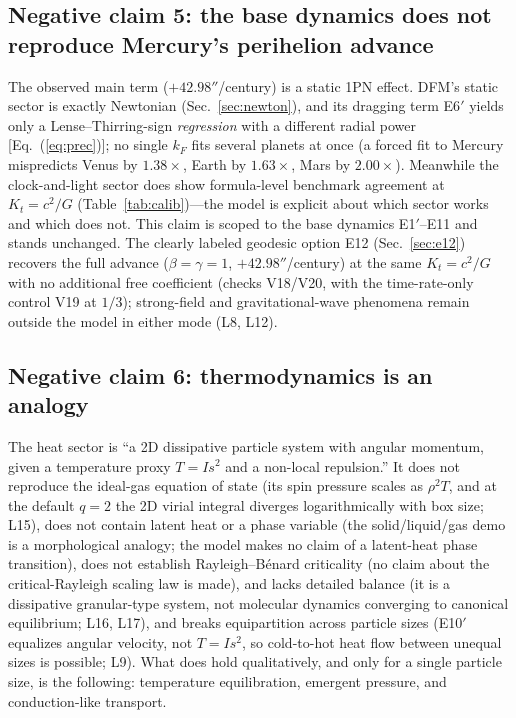 \documentclass[aps,reprint,amsmath,amssymb,nofootinbib,superscriptaddress,floatfix]{revtex4-2}
\newcommand{\Kt}{K_t}
\begin{document}
\subsection{Negative claim 5: the base dynamics does not reproduce
Mercury's perihelion advance}
The observed main term ($+42.98''$/century) is a static 1PN effect.
DFM's static sector is exactly Newtonian
(Sec.~\ref{sec:newton}), and its dragging term E6$'$ yields only a
Lense--Thirring-sign \emph{regression} with a different radial power
[Eq.~(\ref{eq:prec})]; no single $k_F$ fits several planets at once
(a forced fit to Mercury mispredicts Venus by $1.38\times$, Earth by
$1.63\times$, Mars by $2.00\times$).
Meanwhile the clock-and-light sector does show formula-level benchmark
agreement at $\Kt = c^2/G$ (Table~\ref{tab:calib})---the model is
explicit about which sector works and which does not.
This claim is scoped to the base dynamics E1$'$--E11 and stands
unchanged.
The clearly labeled geodesic option E12 (Sec.~\ref{sec:e12}) recovers
the full advance ($\beta = \gamma = 1$, $+42.98''$/century) at the
same $\Kt = c^2/G$ with no additional free coefficient (checks
V18/V20, with the time-rate-only control V19 at $1/3$); strong-field
and gravitational-wave phenomena remain outside the model in either
mode (L8, L12).

\subsection{Negative claim 6: thermodynamics is an analogy}
The heat sector is ``a 2D dissipative particle system with angular
momentum, given a temperature proxy $T = Is^2$ and a non-local
repulsion.''
It does not reproduce the ideal-gas equation of state (its spin
pressure scales as $\rho^2T$, and at the default $q = 2$ the 2D virial
integral diverges logarithmically with box size; L15), does not
contain latent heat or a phase variable (the solid/liquid/gas demo is
a morphological analogy; the model makes no claim of a
latent-heat phase transition), does not establish
Rayleigh--B\'enard criticality (no claim about the critical-Rayleigh
scaling law is made), and lacks detailed balance (it is a
dissipative granular-type system, not molecular dynamics converging to
canonical equilibrium; L16, L17), and breaks equipartition across
particle sizes (E10$'$ equalizes angular velocity, not $T = Is^2$,
so cold-to-hot heat flow between unequal sizes is possible; L9).
What does hold qualitatively, and only for a single particle size, is
the following: temperature equilibration, emergent pressure, and
conduction-like transport.
\end{document}
